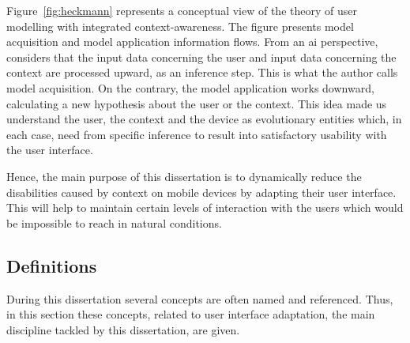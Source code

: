 Figure~\ref{fig:heckmann} represents a conceptual view of the theory of user 
modelling with integrated context-awareness. The figure presents model acquisition 
and model application information flows. From an \ac{ai} perspective, 
\citeauthor{heckmann_ubiquitous_2005} considers that the input data concerning 
the user and input data concerning the context are processed upward, as an 
inference step. This is what the author calls model acquisition. On the contrary,
the model application works downward, calculating a new hypothesis about the user
or the context. This idea made us understand the user, the context and the device
as evolutionary entities which, in each case, need from specific inference to
result into satisfactory usability with the user interface.

Hence, the main purpose of this dissertation is to dynamically reduce the 
disabilities caused by context on mobile devices by adapting their user interface. 
This will help to maintain certain levels of interaction with the users which 
would be impossible to reach in natural conditions.

\subsection{Definitions}
\label{sec:definitions}

During this dissertation several concepts are often named and referenced. Thus,
in this section these concepts, related to user interface adaptation, the main
discipline tackled by this dissertation, are given. 

